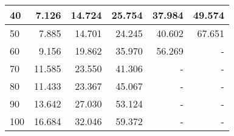 \begin{table}[h]
\begin{tabular}{|l|r|r|r|r|r|}
40                               & 7.126           & 14.724           & 25.754           & 37.984           & 49.574           \\ \hline
50                               & 7.885           & 14.701           & 24.245           & 40.602           & 67.651           \\ \hline
60                               & 9.156           & 19.862           & 35.970           & 56.269           & -                \\ \hline
70                               & 11.585          & 23.550           & 41.306           & -                & -                \\ \hline
80                               & 11.433          & 23.367           & 45.067           & -                & -                \\ \hline
90                               & 13.642          & 27.030           & 53.124           & -                & -                \\ \hline
100                              & 16.684          & 32.046           & 59.372           & -                & -                \\ \hline
\end{tabular}
\end{table}


